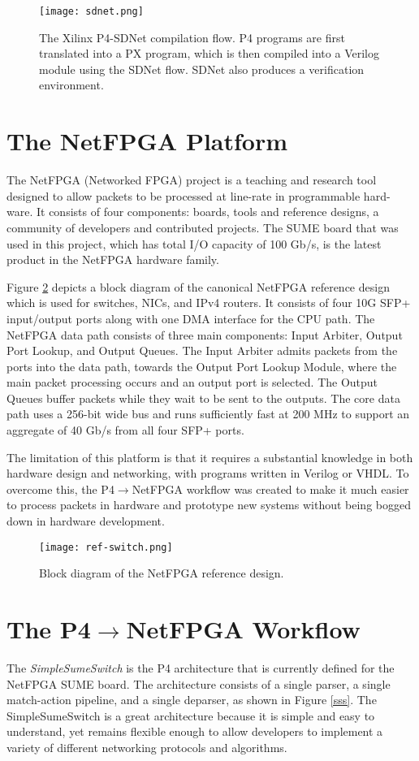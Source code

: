 \begin{figure}[!h]
	\centering
	\texttt{[image: sdnet.png]}
	\caption{The Xilinx P4-SDNet compilation flow. P4 programs are first translated into a PX program, which is then compiled into a Verilog module using the SDNet flow. SDNet also produces a verification environment.}
	\label{sdnet}
\end{figure}

\section{The NetFPGA Platform}
The NetFPGA (Networked FPGA) project is a teaching and research tool designed to allow packets to be processed at line-rate in programmable hard-ware. It consists of four components: boards, tools and reference designs, a community of developers and contributed projects. The SUME board that was used in this project, which has total I/O capacity of 100 Gb/s, is the latest product in the NetFPGA hardware family. 

Figure \ref{ref-switch} depicts a block diagram of the canonical NetFPGA reference design which is used for switches, NICs, and IPv4 routers. It consists of four 10G SFP+ input/output ports along with one DMA interface for the CPU path. The NetFPGA data path consists of three main components: Input Arbiter, Output Port Lookup, and Output Queues. The Input Arbiter admits packets from the ports into the data path, towards the Output Port Lookup Module, where the main packet processing occurs and an output port is selected. The Output Queues buffer packets while they wait to be sent to the outputs. The core data path uses a 256-bit wide bus and runs sufficiently fast at 200 MHz to support an aggregate of 40 Gb/s from all four SFP+ ports.

The limitation of this platform is that it requires a substantial knowledge in both hardware design and networking, with programs written in Verilog or VHDL. To overcome this, the P4$\rightarrow$NetFPGA workflow was created to make it much easier to process packets in hardware and prototype new systems without being bogged down in hardware development.

\begin{figure}[!ht]
	\centering
	\texttt{[image: ref-switch.png]}
	\caption{Block diagram of the NetFPGA reference design.}
	\label{ref-switch}
\end{figure}

\section{The P4$\rightarrow$NetFPGA Workflow}
\label{sec:p4-netfpga}
The \textit{SimpleSumeSwitch} is the P4 architecture that is currently defined for the NetFPGA SUME board. The architecture consists of a single parser, a single match-action pipeline, and a single deparser, as shown in Figure \ref{sss}. The SimpleSumeSwitch is a great architecture because it is simple and easy to understand, yet remains flexible enough to allow developers to implement a variety of different networking protocols and algorithms. 

